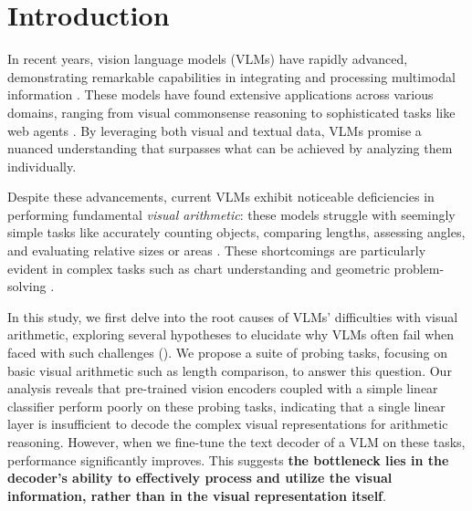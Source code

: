 \section{Introduction}

In recent years, vision language models (VLMs) have rapidly advanced, demonstrating remarkable capabilities in integrating and processing multimodal information \cite{liu2023llava, dai2023instructblip, chen2024internvl, xue2024xgen}. These models have found extensive applications across various domains, ranging from visual commonsense reasoning to sophisticated tasks like web agents \cite{xu2024llavacot, zhang2024improve, xie2024osworld, lin2024showui}. By leveraging both visual and textual data, VLMs promise a nuanced understanding that surpasses what can be achieved by analyzing them individually. %

Despite these advancements, current VLMs exhibit noticeable deficiencies in performing fundamental \textit{visual arithmetic}: these models struggle with seemingly simple tasks like accurately counting objects, comparing lengths, assessing angles, and evaluating relative sizes or areas \cite{Rahmanzadehgervi_2024_blind, wang2024vdlm, huang2024frompixels, ullman2024illusion, wei2024slow}. These shortcomings are particularly evident in complex tasks such as chart understanding \cite{huang-etal-2024-lvlms} and geometric problem-solving \cite{gao2023gllava}. %


In this study, we first delve into the root causes of VLMs' difficulties with visual arithmetic, exploring several hypotheses to elucidate why VLMs often fail when faced with such challenges (). We propose a suite of probing tasks, focusing on basic visual arithmetic such as length comparison, to answer this question. %
Our analysis reveals that pre-trained vision encoders coupled with a simple linear classifier perform poorly on these probing tasks, indicating that a single linear layer is insufficient to decode the complex visual representations for arithmetic reasoning. However, when we fine-tune the  text decoder of a VLM on these tasks, performance significantly improves.  This suggests \textbf{the bottleneck lies in the decoder's ability to effectively process and utilize the visual information, rather than in the visual representation itself}.  


